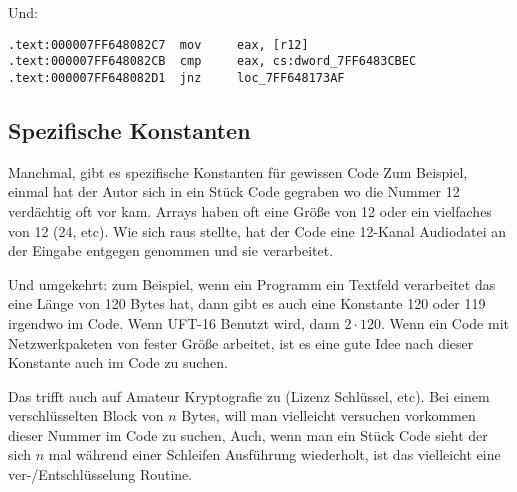 Und:

\begin{lstlisting}[caption=dhcpcore.dll (Windows 7 x64),style=customasmx86]
.text:000007FF648082C7  mov     eax, [r12]
.text:000007FF648082CB  cmp     eax, cs:dword_7FF6483CBEC
.text:000007FF648082D1  jnz     loc_7FF648173AF
\end{lstlisting}

\subsection{Spezifische Konstanten}

Manchmal, gibt es spezifische Konstanten für gewissen Code %
Zum Beispiel, einmal hat der Autor sich in ein Stück Code gegraben wo die Nummer 12 verdächtig
oft vor kam. Arrays haben oft eine Größe von 12 oder ein vielfaches von 12 (24, etc). 
Wie sich raus stellte, hat der Code eine 12-Kanal Audiodatei an der Eingabe entgegen genommen und
sie verarbeitet.


Und umgekehrt: zum Beispiel, wenn ein Programm ein Textfeld verarbeitet das eine Länge von 120 Bytes hat,
dann gibt es auch eine Konstante 120 oder 119 irgendwo im Code.
Wenn UFT-16 Benutzt wird, dann $2 \cdot 120$. Wenn ein Code mit Netzwerkpaketen von fester Größe
arbeitet, ist es eine gute Idee nach dieser Konstante auch im Code zu suchen.


Das trifft auch auf Amateur Kryptografie zu (Lizenz Schlüssel, etc). 
Bei einem verschlüsselten Block von $n$ Bytes, will man vielleicht versuchen vorkommen dieser Nummer im Code zu suchen,
Auch, wenn man ein Stück Code sieht der sich $n$ mal während einer Schleifen Ausführung wiederholt, ist das vielleicht
eine ver-/Entschlüsselung Routine.


